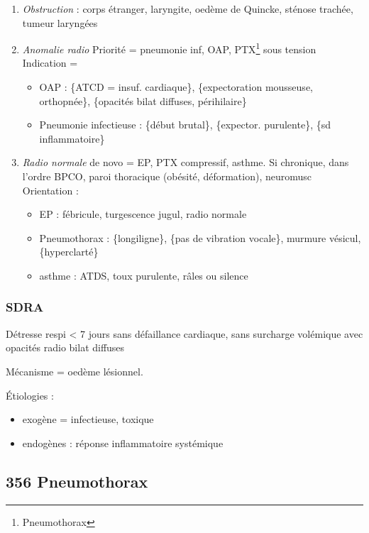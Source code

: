 \documentclass[11pt]{article}
\begin{document}
\begin{enumerate}
\item \emph{Obstruction}  : corps étranger, laryngite, oedème de Quincke, sténose
trachée, tumeur laryngées
\item \emph{Anomalie radio} Priorité = pneumonie inf, OAP,
PTX\footnote{Pneumothorax} sous
tension\\
Indication =

\begin{itemize}
\item OAP : \{ATCD = insuf. cardiaque\}, \{expectoration mousseuse, orthopnée\},
\{opacités bilat diffuses, périhilaire\}
\item Pneumonie infectieuse : \{début brutal\}, \{expector. purulente\}, \{sd
inflammatoire\}
\end{itemize}

\item \emph{Radio normale} de novo = EP, PTX compressif, asthme. Si
chronique, dans l'ordre BPCO, paroi thoracique (obésité, déformation),
neuromusc\\
Orientation :

\begin{itemize}
\item EP : fébricule, turgescence jugul, radio normale
\item Pneumothorax : \{longiligne\}, \{pas de vibration vocale\}, murmure vésicul,
\{hyperclarté\}
\item asthme : ATDS, toux purulente, râles ou silence
\end{itemize}
\end{enumerate}

\subsubsection{SDRA}
\label{sec:org077a942}
Détresse respi < 7 jours sans défaillance cardiaque, sans surcharge volémique
avec opacités radio bilat diffuses

Mécanisme = oedème lésionnel.

Étiologies :

\begin{itemize}
\item exogène = infectieuse, toxique
\item endogènes : réponse inflammatoire systémique
\end{itemize}


\subsection{356 \textdagger{} Pneumothorax}
\label{sec:orgfc4b892}
\end{document}
